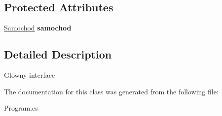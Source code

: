 \subsection*{Protected Attributes}
\begin{DoxyCompactItemize}
\item 
\mbox{\label{class_builder_1_1_program_1_1_builder_a8bedc36c849a81f778fef38d4d8677ee}} 
\hyperlink{class_builder_1_1_program_1_1_samochod}{Samochod} {\bfseries samochod}
\end{DoxyCompactItemize}


\subsection{Detailed Description}
Glowny interface 



The documentation for this class was generated from the following file\+:\begin{DoxyCompactItemize}
\item 
Program.\+cs\end{DoxyCompactItemize}
